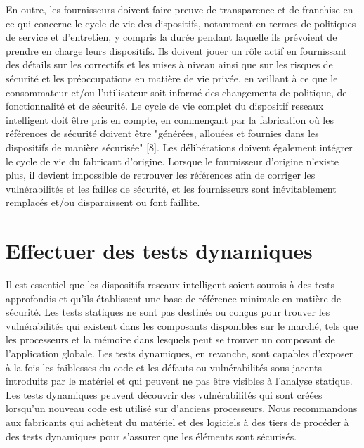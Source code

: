 \documentclass[12pt]{report}
\begin{document}
En outre, les fournisseurs doivent faire preuve de transparence et de franchise en ce qui concerne le cycle
de vie des dispositifs, notamment en termes de politiques de service et
d'entretien, y compris la durée pendant laquelle ils prévoient de
prendre en charge leurs dispositifs. Ils doivent jouer un rôle actif en
fournissant des détails sur les correctifs et les mises à niveau ainsi
que sur les risques de sécurité et les préoccupations en matière de vie
privée, en veillant à ce que le consommateur et/ou l'utilisateur soit
informé des changements de politique, de fonctionnalité et de sécurité.
Le cycle de vie complet du dispositif reseaux intelligent doit être pris en compte, en
commençant par la fabrication où les références de sécurité doivent être
"générées, allouées et fournies dans les dispositifs de manière
sécurisée" {[}8{]}. Les délibérations doivent également intégrer le
cycle de vie du fabricant d'origine. Lorsque le fournisseur d'origine
n'existe plus, il devient impossible de retrouver les références afin de
corriger les vulnérabilités et les failles de sécurité, et les
fournisseurs sont inévitablement remplacés et/ou disparaissent ou font
faillite.

\hypertarget{effectuer-des-tests-dynamiques}{%
      \section{\texorpdfstring{Effectuer des tests dynamiques
        }{Effectuer des tests dynamiques }}\label{effectuer-des-tests-dynamiques}}

Il est essentiel que les dispositifs reseaux intelligent soient soumis à des tests
approfondis et qu'ils établissent une base de référence minimale en
matière de sécurité. Les tests statiques ne sont pas destinés ou conçus
pour trouver les vulnérabilités qui existent dans les composants
disponibles sur le marché, tels que les processeurs et la mémoire dans
lesquels peut se trouver un composant de l'application globale. Les
tests dynamiques, en revanche, sont capables d'exposer à la fois les
faiblesses du code et les défauts ou vulnérabilités sous-jacents
introduits par le matériel et qui peuvent ne pas être visibles à
l'analyse statique. Les tests dynamiques peuvent découvrir des
vulnérabilités qui sont créées lorsqu'un nouveau code est utilisé sur
d'anciens processeurs. Nous recommandons aux fabricants qui achètent du
matériel et des logiciels à des tiers de procéder à des tests dynamiques
pour s'assurer que les éléments sont sécurisés.
\end{document}
